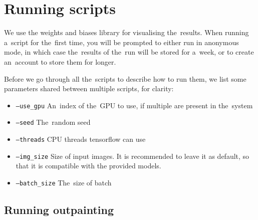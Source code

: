 \section{Running scripts}

We use the weights and biases library \citep{wandb} for visualising the~results. When running a~script for the~first time, you will be prompted to either run in anonymous mode, in which case the~results of the~run will be stored for a~week, or to create an~account to store them for longer. 

Before we go through all the~scripts to describe how to run them, we list some parameters shared between multiple scripts, for clarity:
\begin{itemize}
    \item \texttt{--use\_gpu} An~index of the~GPU to use, if multiple are present in the~system
    \item \texttt{--seed} The~random seed
    \item \texttt{--threads} CPU threads tensorflow can use
    \item \texttt{--img\_size} Size of input images. It is recommended to leave it as default, so that it is compatible with the provided models.
    \item \texttt{--batch\_size} The~size of batch
\end{itemize}



\subsection{Running outpainting}



